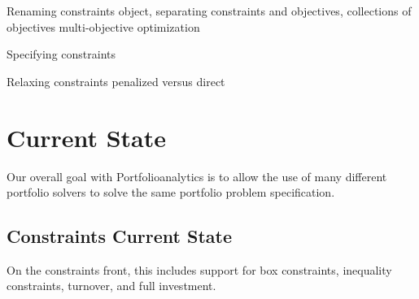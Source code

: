 \documentclass[12pt,letterpaper,english]{article}
\begin{document}
Renaming constraints object, separating constraints and objectives, collections of objectives multi-objective optimization

Specifying constraints

Relaxing constraints  penalized versus direct



\section{Current State \label{sec:currentstate}}
Our overall goal with Portfolioanalytics is to allow the use of many different portfolio solvers to solve the same portfolio problem specification.  

\subsection{Constraints Current State\label{sec:constraints}}
On the constraints front, this includes support for box constraints, inequality constraints, turnover, and full investment.
\end{document}
